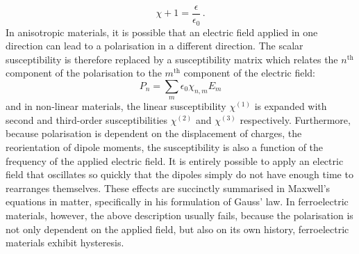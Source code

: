 \begin{equation}
	\chi +1 = \frac{\epsilon}{\epsilon _0} \, .
\end{equation}
In anisotropic materials, it is possible that an electric field applied in one direction can lead to a polarisation in a different direction. The scalar susceptibility is therefore replaced by a susceptibility matrix which relates the $n^{\text{th}}$ component of the polarisation to the $m^{\text{th}}$ component of the electric field:
\begin{equation}
	P_n = \sum _m \epsilon _0 \chi _{n,m} E_m
\end{equation}
and in non-linear materials, the linear susceptibility $\chi^{(1)}$ is expanded with second and third-order susceptibilities $\chi^{(2)}$ and $\chi^{(3)}$ respectively. Furthermore, because polarisation is dependent on the displacement of charges, \ie{} the reorientation of dipole moments, the susceptibility is also a function of the frequency of the applied electric field. It is entirely possible to apply an electric field that oscillates so quickly that the dipoles simply do not have enough time to rearranges themselves. These effects are succinctly summarised in Maxwell's equations in matter, specifically in his formulation of Gauss' law. In ferroelectric materials, however, the above description usually fails, because the polarisation is not only dependent on the applied field, but also on its own history, \ie{} ferroelectric materials exhibit hysteresis.\\
